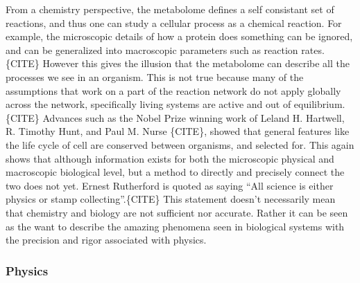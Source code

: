 \documentclass[draft, english]{volcanica-template}
\begin{document}
From a chemistry perspective, the metabolome defines a self consistant set of reactions, and thus one can study a cellular process as a chemical reaction. For example, the microscopic details of how a protein does something can be ignored, and can be generalized into macroscopic parameters such as reaction rates.\{CITE\} However this gives the illusion that the metabolome can describe all the processes we see in an organism. This is not true because many of the assumptions that work on a part of the reaction network do not apply globally across the network, specifically living systems are active and out of equilibrium.\{CITE\} Advances such as the Nobel Prize winning work of Leland H. Hartwell, R. Timothy Hunt, and Paul M. Nurse \{CITE\}, showed that general features like the life cycle of cell are conserved between organisms, and selected for. This again shows that although information exists for both the microscopic physical and macroscopic biological level, but a method to directly  and precisely connect the two does not yet. Ernest Rutherford is quoted as saying ``All science is either physics or stamp collecting''.\{CITE\} This statement doesn't necessarily mean that chemistry and biology are not sufficient nor accurate. Rather it can be seen as the want to describe the amazing phenomena seen in biological systems with the precision and rigor associated with physics.

\subsubsection{Physics}
\end{document}

